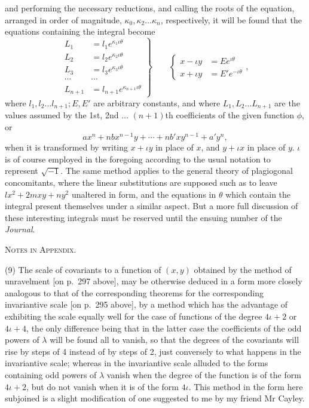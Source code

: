 \documentclass[11pt]{article}
\newcommand{\subpaperhead}[1]{\begin{center}{\large\scshape #1}\end{center}}
\newcommand{\sourcepage}[1]{\marginpar{\scriptsize p.~#1}}
\begin{document}
{{\sourcepage{360}
and performing the necessary reductions, and calling the roots of the equation, arranged in order of magnitude, $\kappa_0,\kappa_2\ldots\kappa_n$, respectively, it will be found that the equations containing the integral become
\[
\left.
\begin{array}{rl}
L_1&=l_1e^{\kappa_1\iota\theta}\\
L_2&=l_2e^{\kappa_2\iota\theta}\\
L_3&=l_3e^{\kappa_3\iota\theta}\\
\cdots&\cdots\\
L_{n+1}&=l_{n+1}e^{\kappa_{n+1}\iota\theta}
\end{array}
\right\}
\qquad
\left\{\begin{array}{rl}
x-\iota y&=Ee^{\iota\theta}\\
x+\iota y&=E'e^{-\iota\theta}
\end{array}\right.,
\]
where $l_1,l_2\ldots l_{n+1};E,E'$ are arbitrary constants, and where $L_1,L_2\ldots L_{n+1}$ are the values assumed by the 1st, 2nd $\ldots$ $(n+1)$th coefficients of the given function $\phi$, or
\[
ax^n+nbx^{n-1}y+\cdots+nb'xy^{n-1}+a'y^n,
\]
when it is transformed by writing $x+\iota y$ in place of $x$, and $y+\iota x$ in place of $y$. $\iota$ is of course employed in the foregoing according to the usual notation to represent $\sqrt{-1}$. The same method applies to the general theory of plagiogonal concomitants, where the linear substitutions are supposed such as to leave $lx^2+2mxy+ny^2$ unaltered in form, and the equations in $\theta$ which contain the integral present themselves under a similar aspect. But a more full discussion of these interesting integrals must be reserved until the ensuing number of the \emph{Journal}.

\subpaperhead{Notes in Appendix.}

(9) The scale of covariants to a function of $(x,y)$ obtained by the method of unravelment [on p.~297 above], may be otherwise deduced in a form more closely analogous to that of the corresponding theorems for the corresponding invariantive scale [on p.~295 above], by a method which has the advantage of exhibiting the scale equally well for the case of functions of the degree $4\iota+2$ or $4\iota+4$, the only difference being that in the latter case the coefficients of the odd powers of $\lambda$ will be found all to vanish, so that the degrees of the covariants will rise by steps of 4 instead of by steps of 2, just conversely to what happens in the invariantive scale; whereas in the invariantive scale alluded to the forms containing odd powers of $\lambda$ vanish when the degree of the function is of the form $4\iota+2$, but do not vanish when it is of the form $4\iota$. This method in the form here subjoined is a slight modification of one suggested to me by my friend Mr Cayley.

}}
\end{document}
